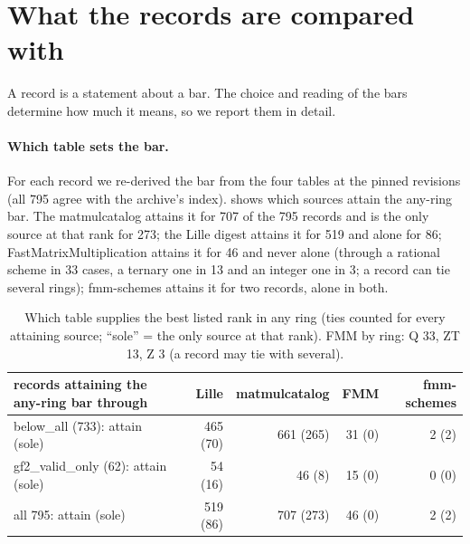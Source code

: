 \section{What the records are compared with}\label{sec:comparators}

A record is a statement about a bar. The choice and reading of the bars determine how much it means, so we report them in detail.

\paragraph{Which table sets the bar.}
For each record we re-derived the bar from the four tables at the pinned revisions (all 795 agree with the archive's index).  shows which sources attain the any-ring bar. The matmulcatalog attains it for 707 of the 795 records and is the only source at that rank for 273; the Lille digest attains it for 519 and alone for 86; FastMatrixMultiplication attains it for 46 and never alone (through a rational scheme in 33 cases, a ternary one in 13 and an integer one in 3; a record can tie several rings); fmm-schemes attains it for two records, alone in both.
\begin{table}[t]
\centering\small
\begin{tabular}{@{}lrrrr@{}}
\toprule
records attaining the any-ring bar through & Lille & matmulcatalog & FMM & fmm-schemes\\
\midrule
\textsf{below\_all} (733): attain (sole) & 465 (70) & 661 (265) & 31 (0) & 2 (2)\\
\textsf{gf2\_valid\_only} (62): attain (sole) & 54 (16) & 46 (8) & 15 (0) & 0 (0)\\
all 795: attain (sole) & 519 (86) & 707 (273) & 46 (0) & 2 (2)\\
\bottomrule
\end{tabular}
\caption{Which table supplies the best listed rank in any ring (ties counted for every attaining source; ``sole'' = the only source at that rank). FMM by ring: Q 33, ZT 13, Z 3 (a record may tie with several).}
\label{tab:suppliers}
\end{table}


